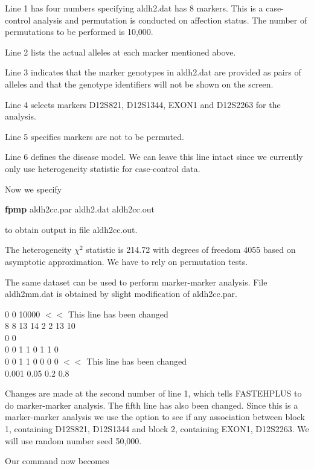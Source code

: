 \documentclass[11pt]{article}
\begin{document}
\noindent Line 1 has four numbers specifying aldh2.dat has 8 markers.  This is a
case-control analysis and permutation is conducted on affection status.
The number of permutations to be performed is 10,000.

\medskip
\noindent Line 2 lists the actual alleles at each marker mentioned above.

\medskip
\noindent Line 3 indicates that the marker genotypes in aldh2.dat are provided as pairs
of alleles and that the genotype identifiers will not be shown on the screen.

\medskip
\noindent Line 4 selects markers D12S821, D12S1344, EXON1 and D12S2263 for the analysis.

\medskip
\noindent Line 5 specifies markers are not to be permuted.

\medskip
\noindent Line 6 defines the disease model.  We can leave this line intact since we
currently only use heterogeneity statistic for case-control data.

\medskip
Now we specify

\medskip
{\bf fpmp} aldh2cc.par aldh2.dat aldh2cc.out
\medskip

to obtain output in file aldh2cc.out.

The heterogeneity $\chi^2$ statistic is 214.72 with degrees of freedom
4055 based on asymptotic approximation. We have to rely on permutation
tests.

The same dataset can be used to perform marker-marker analysis.  File
aldh2mm.dat is obtained by slight modification of aldh2cc.par.

{\small
\medskip{}  0  0  10000        $<<$ This line has been changed\\
8 8 13 14 2 2 13 10\\
0 0\\
0 0 1 1 0 1 1 0\\
0 0 1 1 0 0 0 0       $<<$ This line has been changed\\
0.001 0.05 0.2 0.8\\
}

Changes are made at the second number of line 1, which tells FASTEHPLUS to do
marker-marker analysis.  The fifth line has also been changed.  Since this is a
marker-marker analysis we use the option to see if any association between
block 1, containing D12S821, D12S1344 and block 2, containing EXON1, D12S2263.
We will use random number seed 50,000.

\medskip
Our command now becomes
\end{document}
